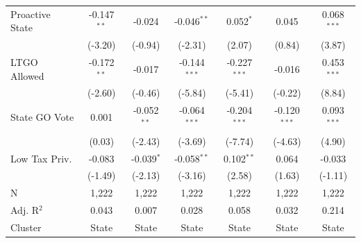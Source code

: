 \begin{tabular*}{\textwidth}{@{\extracolsep{\fill}}lcccccc}
   Proactive State           & -0.147$^{**}$ & -0.024        & -0.046$^{**}$  & 0.052$^{*}$    & 0.045          & 0.068$^{***}$\\   
                             & (-3.20)      & (-0.94)      & (-2.31)       & (2.07)        & (0.84)        & (3.87)\\   
   LTGO Allowed              & -0.172$^{**}$ & -0.017        & -0.144$^{***}$ & -0.227$^{***}$ & -0.016         & 0.453$^{***}$\\   
                             & (-2.60)      & (-0.46)      & (-5.84)       & (-5.41)       & (-0.22)       & (8.84)\\   
   State GO Vote             & 0.001         & -0.052$^{**}$ & -0.064$^{***}$ & -0.204$^{***}$ & -0.120$^{***}$ & 0.093$^{***}$\\   
                             & (0.03)       & (-2.43)      & (-3.69)       & (-7.74)       & (-4.63)       & (4.90)\\   
   Low Tax Priv.             & -0.083        & -0.039$^{*}$  & -0.058$^{**}$  & 0.102$^{**}$   & 0.064          & -0.033\\   
                             & (-1.49)      & (-2.13)      & (-3.16)       & (2.58)        & (1.63)        & (-1.11)\\   
   \hline
   N              & 1,222         & 1,222         & 1,222          & 1,222          & 1,222          & 1,222\\  
   Adj. R$^2$            & 0.043         & 0.007         & 0.028          & 0.058          & 0.032          & 0.214\\  
   Cluster              & State & State & State & State & State & State\\  
   \bottomrule
\end{tabular*}
\par\endgroup

